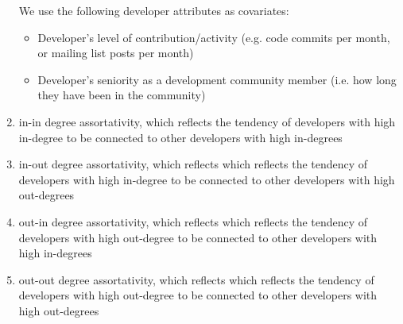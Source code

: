 \documentclass[12pt,letterpaper]{gthesis2}  %
\begin{document}
\begin{enumerate}
We use the following developer attributes as covariates:
\begin{itemize}
\item Developer's level of contribution/activity (e.g. code commits per month, or mailing list posts per month)
\item Developer's seniority as a development community member (i.e. how long they have been in the community)
\end{itemize}

\item{in-in degree assortativity, which reflects the tendency of developers with high in-degree to be connected to other developers with high in-degrees}
\item{in-out degree assortativity, which reflects which reflects the tendency of developers with high in-degree to be connected to other developers with high out-degrees}
\item{out-in degree assortativity, which reflects which reflects the tendency of developers with high out-degree to be connected to other developers with high in-degrees}
\item{out-out degree assortativity, which reflects which reflects the tendency of developers with high out-degree to be connected to other developers with high out-degrees}
\end{enumerate}
%
\end{document}
